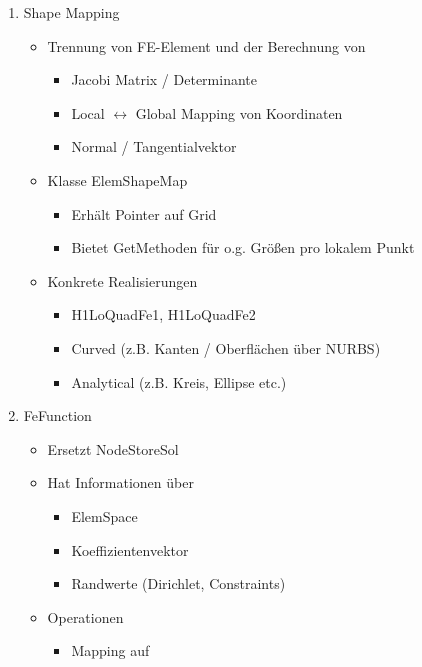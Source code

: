 \begin{enumerate}
\begin{itemize}
\item  Gleichungsnummern   einfacher  vergeben  mit  {\tt   std::map<>}  statt
  indirektem Mapping (nodeGlobal-nodeLocal-eqn)

\end{itemize}

\item Shape Mapping
\begin{itemize}
\item Trennung von FE-Element und der Berechnung von
\begin{itemize}
\item Jacobi Matrix / Determinante
\item Local $\leftrightarrow$ Global Mapping von Koordinaten
\item Normal / Tangentialvektor
\end{itemize}
\item Klasse ElemShapeMap
\begin{itemize}
\item Erhält Pointer auf Grid
\item Bietet GetMethoden für o.g. Größen pro lokalem Punkt
\end{itemize}
\item Konkrete Realisierungen
\begin{itemize}
\item H1LoQuadFe1, H1LoQuadFe2
\item Curved (z.B. Kanten / Oberflächen über NURBS)
\item Analytical (z.B. Kreis, Ellipse etc.)
\end{itemize}
\end{itemize}

\item FeFunction

\begin{itemize}
\item Ersetzt NodeStoreSol
\item Hat Informationen über
\begin{itemize}
\item ElemSpace
\item Koeffizientenvektor
\item Randwerte (Dirichlet, Constraints)
\end{itemize}
\item Operationen
\begin{itemize}
\item Mapping auf 
\end{itemize}
\end{itemize}

\end{enumerate}

